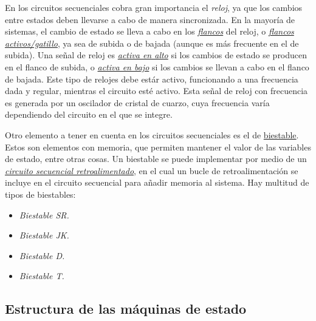 En los circuitos secuenciales cobra gran importancia el \emph{reloj}, ya que los cambios entre estados deben llevarse a cabo de manera sincronizada. En la mayoría de sistemas, el cambio de estado se lleva a cabo en los \hyperlink{edge}{\emph{flancos}} del reloj, o \hyperlink{active_edge}{\emph{flancos activos/gatillo}}, ya sea de subida o de bajada (aunque es más frecuente en el de subida). Una señal de reloj es \hyperlink{active_high}{\emph{activa en alto}} si los cambios de estado se producen en el flanco de subida, o \hyperlink{active_low}{\emph{activa en bajo}} si los cambios se llevan a cabo en el flanco de bajada. Este tipo de relojes debe estár activo, funcionando a una frecuencia dada y regular, mientras el circuito esté activo. Esta señal de reloj con frecuencia es generada por un oscilador de cristal de cuarzo, cuya frecuencia varía dependiendo del circuito en el que se integre.

Otro elemento a tener en cuenta en los circuitos secuenciales es el de \hyperlink{flip-flop}{biestable}. Estos son elementos con memoria, que permiten mantener el valor de las variables de estado, entre otras cosas. Un biestable se puede implementar por medio de un \hyperlink{feedback_sequential_circuit}{\emph{circuito secuencial retroalimentado}}, en el cual un bucle de retroalimentación se incluye en el circuito secuencial para añadir memoria al sistema. Hay multitud de tipos de biestables:

\begin{itemize}
    \item \emph{Biestable SR.}
    \item \emph{Biestable JK.}
    \item \emph{Biestable D.}
    \item \emph{Biestable T.}
\end{itemize}

\subsection{Estructura de las máquinas de estado}

